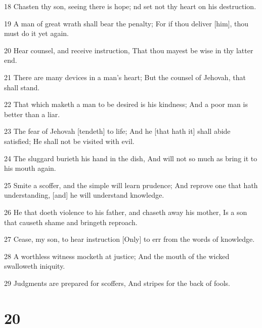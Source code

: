 \par 18 Chasten thy son, seeing there is hope; nd set not thy heart on his destruction.
\par 19 A man of great wrath shall bear the penalty; For if thou deliver [him], thou must do it yet again.
\par 20 Hear counsel, and receive instruction, That thou mayest be wise in thy latter end.
\par 21 There are many devices in a man's heart; But the counsel of Jehovah, that shall stand.
\par 22 That which maketh a man to be desired is his kindness; And a poor man is better than a liar.
\par 23 The fear of Jehovah [tendeth] to life; And he [that hath it] shall abide satisfied; He shall not be visited with evil.
\par 24 The sluggard burieth his hand in the dish, And will not so much as bring it to his mouth again.
\par 25 Smite a scoffer, and the simple will learn prudence; And reprove one that hath understanding, [and] he will understand knowledge.
\par 26 He that doeth violence to his father, and chaseth away his mother, Is a son that causeth shame and bringeth reproach.
\par 27 Cease, my son, to hear instruction [Only] to err from the words of knowledge.
\par 28 A worthless witness mocketh at justice; And the mouth of the wicked swalloweth iniquity.
\par 29 Judgments are prepared for scoffers, And stripes for the back of fools.

\chapter{20}

